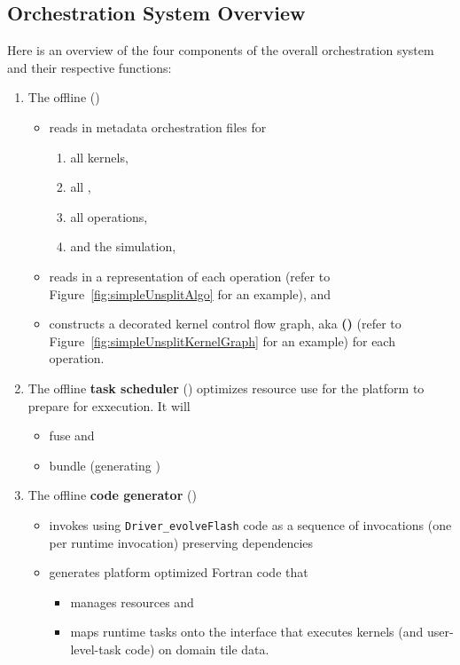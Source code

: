\documentclass{article}
\begin{document}
\subsection{Orchestration System Overview}
Here is an overview  of the four components of the overall orchestration system
and their respective functions:
\begin{enumerate}
\item{The offline \textbf{\spelledoutKGC} (\textbf{\shortKGC})}
    \begin{itemize}
    \item{reads in metadata orchestration files for
      \begin{enumerate}
      \item{all kernels, }
      \item{all \OLARs, }
      \item{all operations, }
      \item{and the simulation, }\end{enumerate}}
    \item{reads in a representation of each operation (refer
    to Figure~\ref{fig:simpleUnsplitAlgo} for an example), and}
    \item{constructs a decorated kernel control flow graph,
    aka \textbf{\spelledoutAKG (\shortAKG)} (refer to
    Figure~\ref{fig:simpleUnsplitKernelGraph} for an example) for each operation.}
    \end{itemize}
\item{The offline \textbf{task scheduler} (\textbf{\shortTS}) optimizes resource use
for the platform to prepare for exxecution. It will
    \begin{itemize}
    \item fuse \OLARs and
    \item bundle \OLARs (generating \textbf{\taskcodebundles})
    \end{itemize}
    }
\item{The offline \textbf{code generator} (\textbf{\shortCG})}
    \begin{itemize}
    \item{invokes \taskcodebundles using \texttt{Driver\_evolveFlash} code
    as a sequence of \OR invocations (one
    \actionroutinebundle per runtime invocation) preserving dependencies}
    \item generates platform optimized Fortran code that
      \begin{itemize}
        \item manages resources and
        \item maps
    runtime tasks onto the interface that executes kernels (and user-level-task code) on domain tile data.
      \end{itemize}


\end{itemize}
\end{enumerate}
\end{document}
